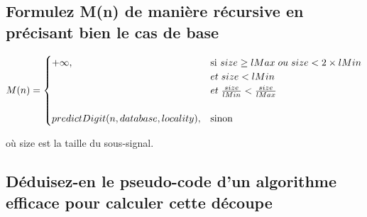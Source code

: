 \documentclass[a4paper,11pt]{article}
\begin{document}
\subsection{Formulez M(n) de manière récursive en précisant bien le cas de base}

  \begin{equation*}
    M(n) =
    \begin{cases}
      +\infty, & \text{si}\ size \ge lMax \hspace{0.1cm} ou \hspace{0.1cm} size < 2 \times lMin \\ & et \hspace{0.1cm} size < lMin \\ & et \hspace{0.1cm} \frac{size}{lMin} < \frac{size}{lMax} \\
      \\
      predictDigit(n, database, locality),  & \text{sinon}
    \end{cases}
  \end{equation*}
  
  où size est la taille du sous-signal.
\newpage

\subsection{Déduisez-en le pseudo-code d'un algorithme efficace pour calculer cette découpe}
\end{document}
